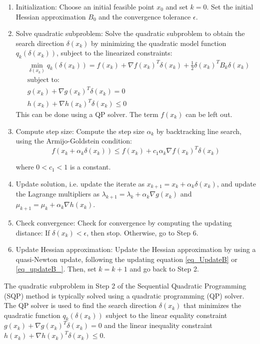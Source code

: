 \documentclass  [
  paper    = a4,
  BCOR     = 10mm,
  twoside,
  fontsize = 12pt,
  fleqn,
  toc      = bibnumbered,
  toc      = listofnumbered,
  numbers  = noendperiod,
  headings = normal,
  listof   = leveldown,
  version  = 3.03
]                                       {scrreprt}
\newcommand{\<}{\langle}
\renewcommand{\>}{\rangle}
\begin{document}
\begin{enumerate}
	\item Initialization: Choose an initial feasible point $x_0$ and set $k=0$. Set the initial Hessian approximation $B_0$ and the convergence tolerance $\epsilon$.
	\item Solve quadratic subproblem: Solve the quadratic subproblem to obtain the search direction $\delta(x_k)$ by minimizing the quadratic model function $q_k(\delta(x_k))$, subject to the linearized constraints:
	\begin{align*}
		&\min_{\delta(x_k)} q_k(\delta(x_k)) = f(x_k) + \nabla f(x_k)^T \delta(x_k) + \frac{1}{2} \delta(x_k)^T B_k \delta(x_k)\\
		&\text{subject to:}\\
		&g(x_k) + \nabla g(x_k)^T \delta(x_k) = 0\\
		&h(x_k) + \nabla h(x_k)^T \delta(x_k) \leq 0
	\end{align*}
	This can be done using a QP solver. The term $f(x_k)$ can be left out.
	\item Compute step size: Compute the step size $\alpha_k$ by backtracking line search, using the Armijo-Goldstein condition:
$$f(x_k+\alpha_k \delta(x_k)) \leq f(x_k) + c_1 \alpha_k \nabla f(x_k)^T \delta(x_k)$$


where $0<c_1<1$ is a constant.
\item Update solution, i.e. update the iterate as $x_{k+1} = x_k + \alpha_k \delta(x_k)$, and update the Lagrange multipliers as $\lambda_{k+1} = \lambda_k + \alpha_k \nabla g(x_k)$ and $\mu_{k+1} = \mu_k + \alpha_k \nabla h(x_k)$.

\item Check convergence: Check for convergence by computing the updating distance: If $\delta(x_k) < \epsilon$, then stop. Otherwise, go to Step 6.


\item Update Hessian approximation: Update the Hessian approximation by using a quasi-Newton update, following the updating equation \ref{eq_UpdateB} or \ref{eq_updateB_}. Then, set $k = k + 1$ and go back to Step 2.


\end{enumerate}

The quadratic subproblem in Step 2 of the Sequential Quadratic Programming (SQP) method is typically solved using a quadratic programming (QP) solver. The QP solver is used to find the search direction $ \delta(x_k)$ that minimizes the quadratic function $q_k( \delta(x_k))$ subject to the linear equality constraint $g(x_k) + \nabla g(x_k)^T  \delta(x_k) = 0$ and the linear inequality constraint $h(x_k) + \nabla h(x_k)^T  \delta(x_k) \leq 0$.
\end{document}
